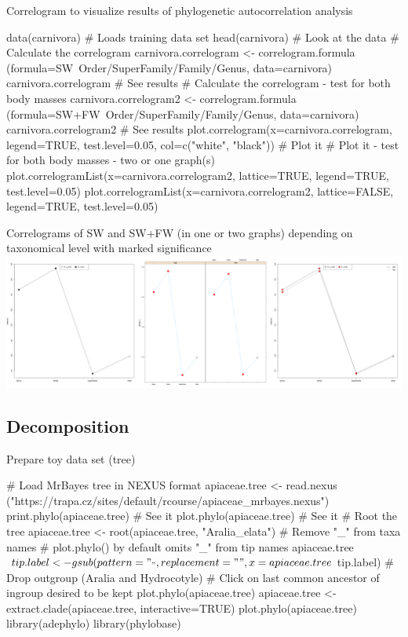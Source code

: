 \documentclass[compress, ucs, xelatex, 11pt, xcolor=svgnames,
  hyperref={
    bookmarks=true,
    unicode=true,
    colorlinks=true,
    pdftitle={Molecular data in R},
    plainpages=false,
    pdfauthor={Vojtech Zeisek},
    pdfsubject={Course about phylogeny and evolution in R},
    pdfcreator={XeLaTeX},
    pdfkeywords={R, evolution, phylogeny, molecular data},
    linkcolor=Tomato,
    anchorcolor=SaddleBrown,
    citecolor=Goldenrod,
    filecolor=DarkMagenta,
    menucolor=Sienna,
    urlcolor=DarkTurquoise,
    pdftex},
  url={hyphens, lowtilde} %
  ]{beamer}
\begin{document}
\begin{frame}[fragile]{Correlogram to visualize results of phylogenetic autocorrelation analysis}
  \begin{spluscode}
    data(carnivora) # Loads training data set
    head(carnivora) # Look at the data
    # Calculate the correlogram
    carnivora.correlogram <- correlogram.formula
      (formula=SW~Order/SuperFamily/Family/Genus, data=carnivora)
    carnivora.correlogram # See results
    # Calculate the correlogram - test for both body masses
    carnivora.correlogram2 <- correlogram.formula
      (formula=SW+FW~Order/SuperFamily/Family/Genus, data=carnivora)
    carnivora.correlogram2 # See results
    plot.correlogram(x=carnivora.correlogram, legend=TRUE,
      test.level=0.05, col=c("white", "black")) # Plot it
    # Plot it - test for both body masses - two or one graph(s)
    plot.correlogramList(x=carnivora.correlogram2, lattice=TRUE,
      legend=TRUE, test.level=0.05)
    plot.correlogramList(x=carnivora.correlogram2, lattice=FALSE,
      legend=TRUE, test.level=0.05)
  \end{spluscode}
\end{frame}

\begin{frame}{Correlograms of SW and SW+FW (in one or two graphs) depending on taxonomical level with marked significance}
\includegraphics[width=\textwidth]{correlog.png}
\end{frame}

\subsection{Decomposition}

\begin{frame}[fragile]{Prepare toy data set (tree)}
  \begin{spluscode}
    # Load MrBayes tree in NEXUS format
    apiaceae.tree <- read.nexus
      ("https://trapa.cz/sites/default/rcourse/apiaceae_mrbayes.nexus")
    print.phylo(apiaceae.tree) # See it
    plot.phylo(apiaceae.tree) # See it
    # Root the tree
    apiaceae.tree <- root(apiaceae.tree, "Aralia_elata")
    # Remove "_" from taxa names
    # plot.phylo() by default omits "_" from tip names
    apiaceae.tree$tip.label <- gsub(pattern="_", replacement=" ",
      x=apiaceae.tree$tip.label)
    # Drop outgroup (Aralia and Hydrocotyle)
    # Click on last common ancestor of ingroup desired to be kept
    plot.phylo(apiaceae.tree)
    apiaceae.tree <- extract.clade(apiaceae.tree, interactive=TRUE)
    plot.phylo(apiaceae.tree)
    library(adephylo)
    library(phylobase)
  \end{spluscode}
\end{frame}
\end{document}
